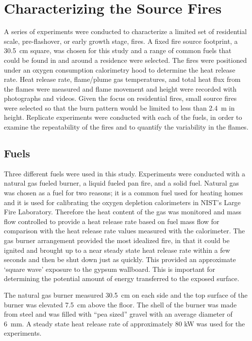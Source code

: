 \documentclass[twoside]{uocthesis}
\begin{document}
{\chapter{Characterizing the Source Fires}
\label{chapter:Characterizing the Source Fires}

A series of experiments were conducted to characterize a limited set of  residential scale, pre-flashover, or early growth stage, fires.  A fixed fire source footprint, a 30.5~cm square, was chosen for this study and a range of common fuels that could be found in and around a residence were selected.  The fires were positioned under an oxygen consumption calorimetry hood to determine the heat release rate.  Heat release rate, flame/plume gas temperatures, and total heat flux from the flames were measured and flame movement and height were recorded with photographs and videos.  Given the focus on residential fires, small source fires were selected so that the burn pattern would be limited to less than 2.4~m in height.  Replicate experiments were conducted with each of the fuels, in order to examine the repeatability of the fires and to quantify the variability in the flames.

\section{Fuels}

Three different fuels were used in this study.  Experiments were conducted with a natural gas fueled burner, a liquid fueled pan fire, and a solid fuel. Natural gas was chosen as a fuel for two reasons; it is a common fuel used for heating homes and it is used for calibrating the oxygen depletion calorimeters in NIST’s Large Fire Laboratory.  Therefore the heat content of the gas was monitored and mass flow controlled to provide a heat release rate based on fuel mass flow for comparison with the heat release rate values measured with the calorimeter.  The gas burner arrangement provided the most idealized fire, in that it could be ignited and brought up to a near steady state heat release rate within a few seconds and then be shut down just as quickly.  This provided an approximate `square wave' exposure to the gypsum wallboard.  This is important for determining the potential amount of energy transferred to the exposed surface.

The natural gas burner measured 30.5~cm on each side and the top surface of the burner was elevated 7.5~cm above the floor. The shell of the burner was made from steel and was filled with ``pea sized'' gravel with an average diameter of 6~mm.  A steady state heat release rate of approximately 80 kW was used for the experiments.

}
\end{document}
